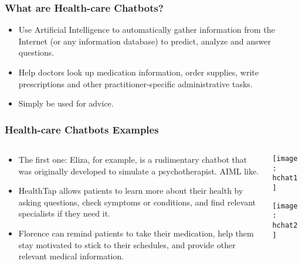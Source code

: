 \begin{frame}[fragile]\frametitle{What are Health-care Chatbots?}

\begin{itemize}
\item Use Artificial Intelligence to automatically gather information from the Internet (or any information database) to predict, analyze and answer questions.
\item  Help doctors look up medication information, order supplies, write prescriptions and other practitioner-specific administrative tasks. 
\item Simply be used for advice.
\end{itemize}


\end{frame}

\begin{frame}[fragile]\frametitle{Health-care Chatbots Examples}

\begin{columns}
\begin{column}[T]{0.5\linewidth}
\begin{itemize}
\item The first one: Eliza, for example, is a rudimentary chatbot that was originally developed to simulate a psychotherapist. AIML like.
\item HealthTap allows patients to learn more about their health by asking questions, check symptoms or conditions, and find relevant specialists if they need it.
\item Florence can remind patients to take their medication, help them stay motivated to stick to their schedules, and provide other relevant medical information.
\end{itemize}
\end{column}
\begin{column}[T]{0.5\linewidth}

\begin{center}
\texttt{[image: hchat1]}

\texttt{[image: hchat2]}
\end{center}

\end{column}

\end{columns}

\end{frame}


